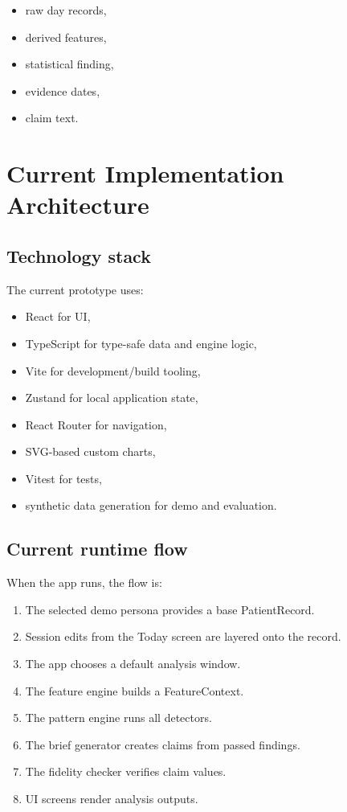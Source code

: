 \documentclass[11pt,a4paper]{article}
\begin{document}
\begin{itemize}
  \item raw day records,
  \item derived features,
  \item statistical finding,
  \item evidence dates,
  \item claim text.
\end{itemize}

\section{Current Implementation Architecture}

\subsection{Technology stack}

The current prototype uses:

\begin{itemize}
  \item React for UI,
  \item TypeScript for type-safe data and engine logic,
  \item Vite for development/build tooling,
  \item Zustand for local application state,
  \item React Router for navigation,
  \item SVG-based custom charts,
  \item Vitest for tests,
  \item synthetic data generation for demo and evaluation.
\end{itemize}

\subsection{Current runtime flow}

When the app runs, the flow is:

\begin{enumerate}
  \item The selected demo persona provides a base PatientRecord.
  \item Session edits from the Today screen are layered onto the record.
  \item The app chooses a default analysis window.
  \item The feature engine builds a FeatureContext.
  \item The pattern engine runs all detectors.
  \item The brief generator creates claims from passed findings.
  \item The fidelity checker verifies claim values.
  \item UI screens render analysis outputs.
\end{enumerate}
\end{document}
